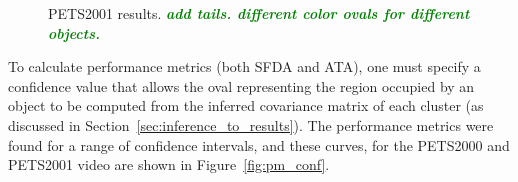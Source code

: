 \documentclass[smallcondensed, final]{svjour3}
\newcommand{\willie}[1]{\textcolor{green}{\textsf{\emph{\textbf{\textcolor{green}{#1}}}}}}
\begin{document}
\begin{figure}
  \centering               
  \caption{PETS2001 results.  \willie{add tails. different color ovals for different objects.}}
  \label{fig:pets2001_overlay}
\end{figure}

To calculate performance metrics (both SFDA and ATA), one must specify a confidence value that allows the oval representing the region occupied by an object to be computed from the inferred covariance matrix of each cluster (as discussed in Section~\ref{sec:inference_to_results}). The performance metrics were found for a range of confidence intervals, and these curves, for the PETS2000 and PETS2001 video are shown in Figure~\ref{fig:pm_conf}.
\end{document}
